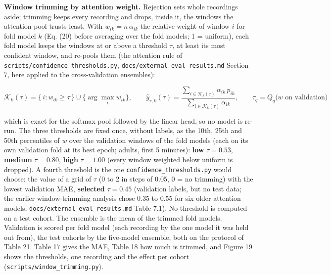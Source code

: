 \documentclass[11pt,a4paper]{article}
\begin{document}
\textbf{Window trimming by attention weight.} Rejection sets whole recordings aside; trimming keeps every recording and drops, inside it, the windows the attention pool trusts least. With $w_{ik} = n\,\alpha_{ik}$ the relative weight of window $i$ for fold model $k$ (Eq. (20) before averaging over the fold models; 1 = uniform), each fold model keeps the windows at or above a threshold $\tau$, at least its most confident window, and re-pools them (the attention rule of \texttt{scripts/confidence\_thresholds.py}, \texttt{docs/external\_eval\_results.md} Section 7, here applied to the cross-validation ensembles):

\begin{equation}
\mathcal{K}_k(\tau) = \{\, i : w_{ik} \ge \tau \,\} \cup \{\arg\max_i w_{ik}\}, \qquad \hat y_{r,k}(\tau) = \frac{\sum_{i \in \mathcal{K}_k(\tau)} \alpha_{ik}\, p_{ik}}{\sum_{i \in \mathcal{K}_k(\tau)} \alpha_{ik}}, \qquad \tau_q = Q_q\big( w \text{ on validation} \big) \tag{23}
\end{equation}

which is exact for the softmax pool followed by the linear head, so no model is re-run. The three thresholds are fixed once, without labels, as the 10th, 25th and 50th percentiles of $w$ over the validation windows of the fold models (each on its own validation fold at its best epoch; adults, first 5 minutes): \textbf{low} $\tau = 0.53$, \textbf{medium} $\tau = 0.80$, \textbf{high} $\tau = 1.00$ (every window weighted below uniform is dropped). A fourth threshold is the one \texttt{confidence\_thresholds.py} would choose: the value of a grid of $\tau$ (0 to 2 in steps of 0.05, 0 = no trimming) with the lowest validation MAE, \textbf{selected} $\tau = 0.45$ (validation labels, but no test data; the earlier window-trimming analysis chose 0.35 to 0.55 for six older attention models, \texttt{docs/external\_eval\_results.md} Table 7.1). No threshold is computed on a test cohort. The ensemble is the mean of the trimmed fold models. Validation is scored per fold model (each recording by the one model it was held out from), the test cohorts by the five-model ensemble, both on the protocol of Table 21. Table 17 gives the MAE, Table 18 how much is trimmed, and Figure 19 shows the thresholds, one recording and the effect per cohort (\texttt{scripts/window\_trimming.py}).
\end{document}
